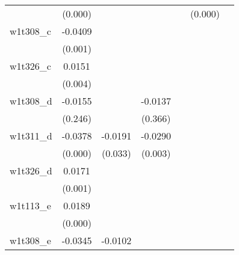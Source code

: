 {\begin{tabular}{l*{6}{c}}
            &     (0.000)         &                     &                     &                     &     (0.000)         &                     \\
[1em]
w1t308\_c    &     -0.0409\sym{***}&                     &                     &                     &                     &                     \\
            &     (0.001)         &                     &                     &                     &                     &                     \\
[1em]
w1t326\_c    &      0.0151\sym{***}&                     &                     &                     &                     &                     \\
            &     (0.004)         &                     &                     &                     &                     &                     \\
[1em]
w1t308\_d    &     -0.0155         &                     &     -0.0137         &                     &                     &                     \\
            &     (0.246)         &                     &     (0.366)         &                     &                     &                     \\
[1em]
w1t311\_d    &     -0.0378\sym{***}&     -0.0191\sym{**} &     -0.0290\sym{***}&                     &                     &                     \\
            &     (0.000)         &     (0.033)         &     (0.003)         &                     &                     &                     \\
[1em]
w1t326\_d    &      0.0171\sym{***}&                     &                     &                     &                     &                     \\
            &     (0.001)         &                     &                     &                     &                     &                     \\
[1em]
w1t113\_e    &      0.0189\sym{***}&                     &                     &                     &                     &                     \\
            &     (0.000)         &                     &                     &                     &                     &                     \\
[1em]
w1t308\_e    &     -0.0345\sym{***}&     -0.0102         &                     &                     &                     &                     \\

\end{tabular}}
